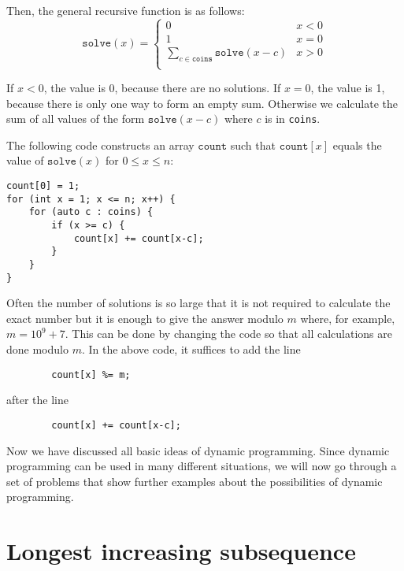 Then, the general recursive function is as follows:
\begin{equation*}
    \texttt{solve}(x) = \begin{cases}
               0               & x < 0\\
               1               & x = 0\\
               \sum_{c \in \texttt{coins}} \texttt{solve}(x-c) & x > 0 \\
           \end{cases}
\end{equation*}

If $x<0$, the value is 0, because there are no solutions.
If $x=0$, the value is 1, because there is only one way
to form an empty sum.
Otherwise we calculate the sum of all values
of the form $\texttt{solve}(x-c)$ where $c$ is in \texttt{coins}.

The following code constructs an array
$\texttt{count}$ such that
$\texttt{count}[x]$ equals
the value of $\texttt{solve}(x)$
for $0 \le x \le n$:

\begin{lstlisting}
count[0] = 1;
for (int x = 1; x <= n; x++) {
    for (auto c : coins) {
        if (x >= c) {
            count[x] += count[x-c];
        }
    }
}
\end{lstlisting}

Often the number of solutions is so large
that it is not required to calculate the exact number
but it is enough to give the answer modulo $m$
where, for example, $m=10^9+7$.
This can be done by changing the code so that
all calculations are done modulo $m$.
In the above code, it suffices to add the line
\begin{lstlisting}
        count[x] %= m;
\end{lstlisting}
after the line
\begin{lstlisting}
        count[x] += count[x-c];
\end{lstlisting}

Now we have discussed all basic
ideas of dynamic programming.
Since dynamic programming can be used
in many different situations,
we will now go through a set of problems
that show further examples about the
possibilities of dynamic programming.

\section{Longest increasing subsequence}


